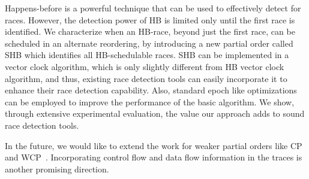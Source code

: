
Happens-before is a powerful technique that can be used to effectively
detect for races.  However, the detection power of HB is limited only
until the first race is identified.  We characterize when an HB-race,
beyond just the first race, can be scheduled in an alternate
reordering, by introducing a new partial order called SHB which
identifies all HB-schedulable races. SHB can be implemented in a
vector clock algorithm, which is only slightly different from HB
vector clock algorithm, and thus, existing race detection tools can
easily incorporate it to enhance their race detection capability.
Also, standard epoch like optimizations can be employed to improve the
performance of the basic algorithm.  We show, through extensive
experimental evaluation, the value our approach adds to sound race
detection tools.

In the future, we would like to extend the work for weaker partial
orders like CP~\cite{cp2012} and WCP~\cite{wcp2017}. Incorporating
control flow and data flow information in the traces is another
promising direction.

